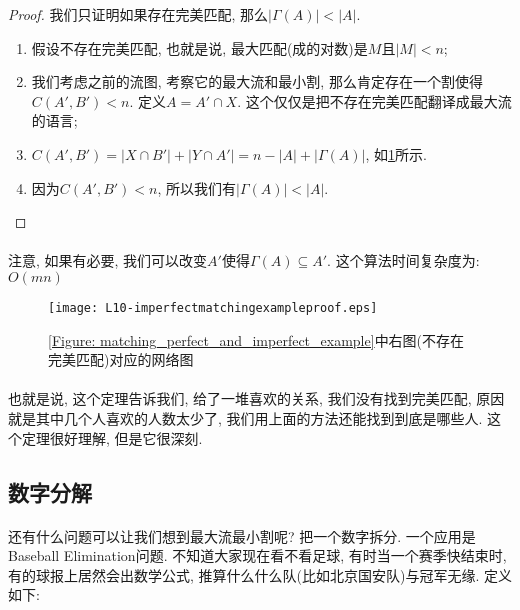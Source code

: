         \begin{proof}
我们只证明如果存在完美匹配, 那么$ |\Gamma(A) | < |A|$.
\begin{enumerate}
\item 假设不存在完美匹配, 也就是说, 最大匹配(成的对数)是$M$且$|M| < n$;
\item 我们考虑之前的流图, 考察它的最大流和最小割, 那么肯定存在一个割使得$C(A', B') < n$. 定义$A=A'\cap X$. 这个仅仅是把不存在完美匹配翻译成最大流的语言;
\item $C(A', B') = | X \cap B' | + | Y \cap A' | = n-|A| + | \Gamma( A ) |$, 如\figurename\ref{Figure: matching_imperfect_matching_example_proof}所示.
\item 因为$ C(A', B') < n$, 所以我们有$ |\Gamma(A) | < |A|$.
\end{enumerate}
\end{proof}
    \paragraph{}注意, 如果有必要, 我们可以改变$A'$使得$\Gamma(A)  \subseteq A'$. 这个算法时间复杂度为: $O(mn)$
        
        \begin{figure}[h]
            \centering
            \texttt{[image: L10-imperfectmatchingexampleproof.eps]}
            \caption{\figurename\ref{Figure: matching_perfect_and_imperfect_example}中右图(不存在完美匹配)对应的网络图}
            \label{Figure: matching_imperfect_matching_example_proof}
        \end{figure}
        \paragraph{}也就是说, 这个定理告诉我们, 给了一堆喜欢的关系, 我们没有找到完美匹配, 原因就是其中几个人喜欢的人数太少了, 我们用上面的方法还能找到到底是哪些人. 这个定理很好理解, 但是它很深刻.


        \subsection{数字分解}
        \paragraph{}还有什么问题可以让我们想到最大流最小割呢? 把一个数字拆分. 一个应用是{\sc Baseball Elimination}问题. 不知道大家现在看不看足球, 有时当一个赛季快结束时, 有的球报上居然会出数学公式, 推算什么什么队(比如北京国安队)与冠军无缘. 定义如下:
